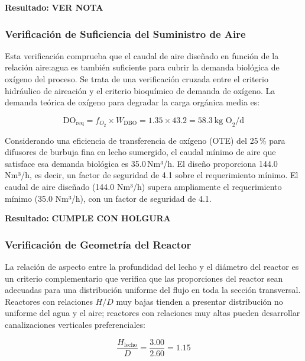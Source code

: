 \documentclass[12pt,a4paper]{article}
\newcommand{\captionequation}[1]{\vspace{-0.5em}\caption*{#1}\vspace{0.5em}}
\begin{document}
\textbf{Resultado:} \textbf{VER NOTA}

\subsubsection*{Verificación de Suficiencia del Suministro de Aire}

Esta verificación comprueba que el caudal de aire diseñado en función de la relación aire:agua es también suficiente para cubrir la demanda biológica de oxígeno del proceso. Se trata de una verificación cruzada entre el criterio hidráulico de aireación y el criterio bioquímico de demanda de oxígeno. La demanda teórica de oxígeno para degradar la carga orgánica media es:

\begin{equation}
\text{DO}_{\text{req}} = f_{O_2} \times W_{\text{DBO}} = 1.35 \times 43.2 = 58.3\ \text{kg O}_2\text{/d}
\end{equation}
\captionequation{Demanda de oxígeno para degradación de DBO}

Considerando una eficiencia de transferencia de oxígeno (OTE) del 25\,\% para difusores de burbuja fina en lecho sumergido, el caudal mínimo de aire que satisface esa demanda biológica es 35.0\,Nm³/h. El diseño proporciona 144.0\,Nm³/h, es decir, un factor de seguridad de 4.1 sobre el requerimiento mínimo. El caudal de aire diseñado (144.0 Nm³/h) supera ampliamente el requerimiento mínimo (35.0 Nm³/h), con un factor de seguridad de 4.1.

\textbf{Resultado:} \textbf{CUMPLE CON HOLGURA}

\subsubsection*{Verificación de Geometría del Reactor}

La relación de aspecto entre la profundidad del lecho y el diámetro del reactor es un criterio complementario que verifica que las proporciones del reactor sean adecuadas para una distribución uniforme del flujo en toda la sección transversal. Reactores con relaciones $H/D$ muy bajas tienden a presentar distribución no uniforme del agua y el aire; reactores con relaciones muy altas pueden desarrollar canalizaciones verticales preferenciales:

\begin{equation}
\frac{H_{\text{lecho}}}{D} = \frac{3.00}{2.60} = 1.15
\end{equation}
\captionequation{Relación de aspecto del lecho de relleno}
\end{document}

